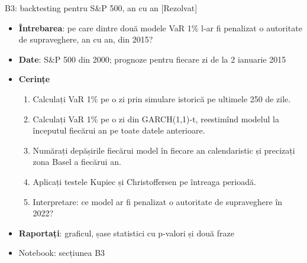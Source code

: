 \begin{frame}{B3: backtesting pentru S\&P 500, an cu an [Rezolvat]}
\itemsize{\footnotesize}
\begin{itemize}
\item \textbf{Întrebarea}: pe care dintre două modele VaR 1\% l-ar fi penalizat o autoritate de supraveghere, an cu an, din 2015?
\item \textbf{Date}: S\&P 500 din 2000; prognoze pentru fiecare zi de la 2 ianuarie 2015
\item \textbf{Cerințe}
\begin{enumerate}
    \item Calculați VaR 1\% pe o zi prin simulare istorică pe ultimele 250 de zile.
    \item Calculați VaR 1\% pe o zi din GARCH(1,1)-t, reestimînd modelul la începutul fiecărui an pe toate datele anterioare.
    \item Numărați depășirile fiecărui model în fiecare an calendaristic și precizați zona Basel a fiecărui an.
    \item Aplicați testele Kupiec și Christoffersen pe întreaga perioadă.
    \item Interpretare: ce model ar fi penalizat o autoritate de supraveghere în 2022?
\end{enumerate}
\item \textbf{Raportați}: graficul, șase statistici cu p-valori și două fraze
\item Notebook: secțiunea B3
\end{itemize}
\end{frame}

